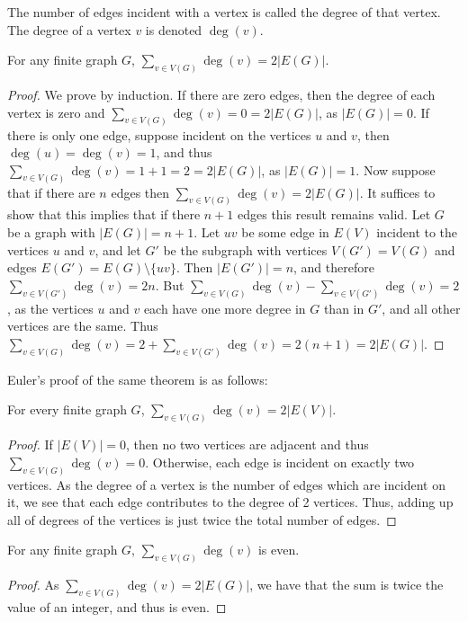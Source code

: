 \documentclass[crop=false,class=book]{standalone}
\begin{document}
\begin{definition}
The number of edges incident with a vertex is called the degree of that vertex. The degree of a vertex $v$ is denoted $\deg(v)$.
\end{definition}
\begin{theorem}
For any finite graph $G$, $\sum_{v\in V(G)} \deg(v) = 2|E(G)|$.
\end{theorem}
\begin{proof}
We prove by induction. If there are zero edges, then the degree of each vertex is zero and $\sum_{v\in V(G)}\deg(v) = 0 = 2|E(G)|$, as $|E(G)| = 0$. If there is only one edge, suppose incident on the vertices $u$ and $v$, then $\deg(u) = \deg(v) = 1$, and thus $\sum_{v\in V(G)} \deg(v) = 1+1 = 2 = 2|E(G)|$, as $|E(G)| = 1$. Now suppose that if there are $n$ edges then $\sum_{v\in V(G)}\deg(v) = 2|E(G)|$. It suffices to show that this implies that if there $n+1$ edges this result remains valid. Let $G$ be a graph with $|E(G)| = n+1$. Let $uv$ be some edge in $E(V)$ incident to the vertices $u$ and $v$, and let $G'$ be the subgraph with vertices $V(G') = V(G)$ and edges $E(G')=E(G)\setminus \{uv\}$. Then $|E(G')| = n$, and therefore $\sum_{v\in V(G')}\deg(v) = 2n$. But $\sum_{v\in V(G)} \deg(v) - \sum_{v\in V(G')}\deg(v) = 2$, as the vertices $u$ and $v$ each have one more degree in $G$ than in $G'$, and all other vertices are the same. Thus $\sum_{v\in V(G)}\deg(v) = 2 + \sum_{v\in V(G')}\deg(v) = 2(n+1) = 2|E(G)|$.
\end{proof}
Euler's proof of the same theorem is as follows:
\begin{theorem}
For every finite graph $G$, $\sum_{v\in V(G)}\deg(v) = 2|E(V)|$.
\end{theorem}
\begin{proof}
If $|E(V)| = 0$, then no two vertices are adjacent and thus $\sum_{v\in V(G)}\deg(v) = 0$. Otherwise, each edge is incident on exactly two vertices. As the degree of a vertex is the number of edges which are incident on it, we see that each edge contributes to the degree of 2 vertices. Thus, adding up all of degrees of the vertices is just twice the total number of edges.
\end{proof}
\begin{corollary}
For any finite graph $G$, $\sum_{v\in V(G)}\deg(v)$ is even.
\end{corollary}
\begin{proof} As $\sum_{v\in V(G)}\deg(v) = 2|E(G)|$, we have that the sum is twice the value of an integer, and thus is even.
\end{proof}
\end{document}
